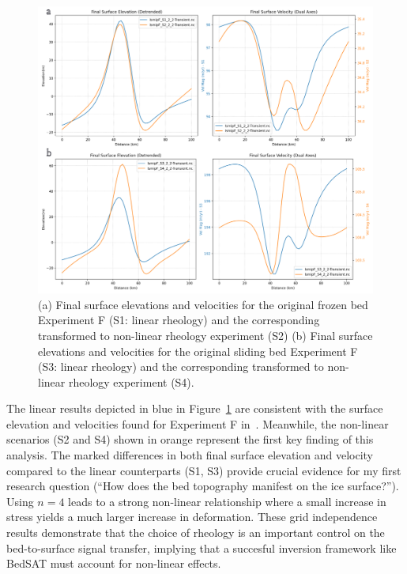 \begin{figure}[H]
    \includegraphics[scale=0.40]{figures/combined_elevation_detrended_surface_velocity_['S1']_['S2']_['S3']_['S4'].png}
    \caption{(a) Final surface elevations and velocities for the original frozen bed Experiment F (S1: linear rheology) and the corresponding transformed to non-linear rheology experiment (S2) (b) Final surface elevations and velocities for the original sliding bed Experiment F (S3: linear rheology) and the corresponding transformed to non-linear rheology experiment (S4).}
    \label{fig:elev_vel_S1_S2_S3_S4}
\end{figure}
The linear results depicted in blue in Figure~\ref{fig:elev_vel_S1_S2_S3_S4} are consistent with the surface elevation and velocities found for Experiment F in~\cite{Pattyn_2008}. Meanwhile, the non-linear scenarios (S2 and S4) shown in orange  represent the first key finding of this analysis. The marked differences in both final surface elevation and velocity compared to the linear counterparts (S1, S3) provide crucial evidence for my first research question (``How does the bed topography manifest on the ice surface?''). Using $n = 4$ leads to a strong non-linear relationship where a small increase in stress yields a much larger increase in deformation. These grid independence results demonstrate that the choice of rheology is an important control on the bed-to-surface signal transfer, implying that a succesful inversion framework like BedSAT must account for non-linear effects.
\newpage
